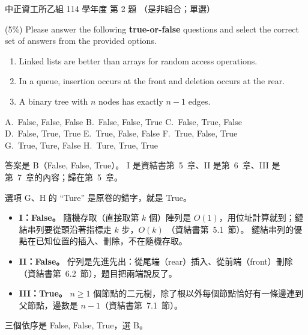 \begin{pastexam}[label={px:ccu-114-csb-02}]{中正資工所乙組 114 學年度 第 2 題}
（是非組合；單選）

(5\%) Please answer the following \textbf{true-or-false} questions and select the correct set of answers from the provided options.
\begin{enumerate}[label=\Roman*.]
\item Linked lists are better than arrays for random access operations.
\item In a queue, insertion occurs at the front and deletion occurs at the rear.
\item A binary tree with $n$ nodes has exactly $n-1$ edges.
\end{enumerate}

A.~False, False, False \qquad B.~False, False, True \qquad C.~False, True, False\\
D.~False, True, True \qquad E.~True, False, False \qquad F.~True, False, True\\
G.~True, Ture, False \qquad H.~Ture, True, True
\end{pastexam}

\begin{pastsoln}
答案是 B（False, False, True）。 I 是資結書第~5~章、II 是第~6~章、III 是第~7~章的內容；歸在第~5~章。

選項 G、H 的 ``Ture'' 是原卷的錯字，就是 True。
\begin{itemize}
\item \textbf{I：False。} 隨機存取（直接取第 $k$ 個）陣列是 $O(1)$，用位址計算就到；鏈結串列要從頭沿著指標走 $k$ 步，$O(k)$
（資結書第~5.1~節）。 鏈結串列的優點在已知位置的插入、刪除，不在隨機存取。
\item \textbf{II：False。} 佇列是先進先出：從尾端（rear）插入、從前端（front）刪除（資結書第~6.2~節），題目把兩端說反了。
\item \textbf{III：True。} $n \ge 1$ 個節點的二元樹，除了根以外每個節點恰好有一條邊連到父節點，邊數是 $n - 1$（資結書第~7.1~節）。
\end{itemize}
三個依序是 False, False, True，選 B。
\end{pastsoln}
